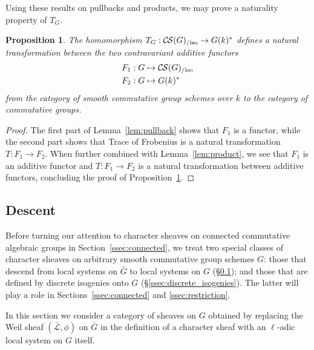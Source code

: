 \documentclass[10pt]{amsart}
\theoremstyle{plain}
\newtheorem{proposition}[theorem]{Proposition}
\theoremstyle{definition}
\newcommand{\Fq}{k}
\newcommand{\TrFrob}[1]{T_{#1}}
\newcommand{\gcs}[1]{{\mathcal{\bar #1}}}
\newcommand{\CS}{{\mathcal{C\hskip-0.8pt S}}}
\newcommand{\CSiso}[1]{\CS(#1)_{/\text{iso}}}
\newcommand{\bG}{\bar{G}}
\begin{document}
Using these results on pullbacks and products, we may prove a naturality property of $\TrFrob{G}$.

\begin{proposition}\label{prop:functorialG}
The homomorphism $\TrFrob{G} : \CSiso{G} \to G(\Fq)^*$ defines a natural transformation
between the two contravariant additive functors
\begin{align*}
F_1 : G &\mapsto \CSiso{G} \\
F_2 : G &\mapsto G(\Fq)^*
\end{align*}
from the category of smooth commutative group schemes over $\Fq$ to the category of commutative groups.
\end{proposition}

\begin{proof}
The first part of Lemma~\ref{lem:pullback} shows that $F_1$ is a functor,
while the second part shows that Trace of Frobenius is a natural transformation
$T: F_1 \to F_2$. When further combined with Lemma~\ref{lem:product},
we see that $F_1$ is an additive functor and $T: F_1 \to F_2$ is a natural
transformation between additive functors,
concluding the proof of Proposition~\ref{prop:functorialG}.
\end{proof}


\subsection{Descent}\label{ssec:descentG}

Before turning our attention to character sheaves on connected commutative algebraic groups in Section~\ref{ssec:connected}, we treat two special classes of character sheaves on arbitrary smooth commutative group schemes $G$: those that descend from local systems on $\bG$ to local systems on $G$ (\S \ref{ssec:descentG}); and those that are defined by discrete isogenies onto $G$ (\S \ref{ssec:discrete_isogenies}). The latter will play a role in Sections~\ref{ssec:connected} and \ref{ssec:restriction}.

In this section we consider a category of sheaves on $G$ obtained by
replacing the Weil sheaf $(\gcs{L}, \phi)$ on $\bG$ in the definition of a character sheaf with an $\ell$-adic local system on $G$ itself.
\end{document}
